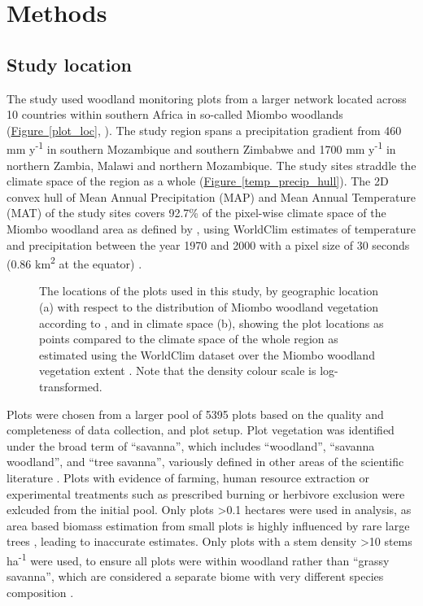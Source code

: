 \documentclass[11pt,a4paper]{article}
\begin{document}
\section{Methods}

\subsection{Study location}

The study used \nplots{} woodland monitoring plots from a larger network located across 10 countries within southern Africa in so-called Miombo woodlands (\hyperref[plot_loc]{Figure~\ref*{plot_loc}}, \citealt{White1983}). The study region spans a precipitation gradient from \textapprox{}460 mm y\textsuperscript{-1} in southern Mozambique and southern Zimbabwe and \textapprox{}1700 mm y\textsuperscript{-1} in northern Zambia, Malawi and northern Mozambique. The study sites straddle the climate space of the region as a whole (\hyperref[temp_precip_hull]{Figure~\ref*{temp_precip_hull}}). The 2D convex hull of Mean Annual Precipitation (MAP) and Mean Annual Temperature (MAT) of the study sites covers 92.7\% of the pixel-wise climate space of the Miombo woodland area as defined by \citet{White}, using WorldClim estimates of temperature and precipitation between the year 1970 and 2000 with a pixel size of 30 seconds (0.86 km\textsuperscript{2} at the equator) \citep{worldclim}. 

\begin{figure}[H]
	\centering
    \qquad
{}%
\caption{The locations of the \nplots{} plots used in this study, by geographic location (a) with respect to the distribution of Miombo woodland vegetation according to \citet{White}, and in climate space (b), showing the plot locations as points compared to the climate space of the whole region as estimated using the WorldClim dataset over the Miombo woodland vegetation extent \citep{worldclim}. Note that the density colour scale is log-transformed.}
\end{figure}

Plots were chosen from a larger pool of 5395 plots based on the quality and completeness of data collection, and plot setup. Plot vegetation was identified under the broad term of ``savanna'', which includes ``woodland'', ``savanna woodland'', and ``tree savanna'', variously defined in other areas of the scientific literature \citep{}. Plots with evidence of farming, human resource extraction or experimental treatments such as prescribed burning or herbivore exclusion were exlcuded from the initial pool. Only plots >0.1 hectares were used in analysis, as area based biomass estimation from small plots is highly influenced by rare large trees \citep{}, leading to inaccurate estimates. Only plots with a stem density >10 stems ha\textsuperscript{-1} were used, to ensure all plots were within woodland rather than ``grassy savanna'', which are considered a separate biome with very different species composition \citep{Parr2014}.
\end{document}

